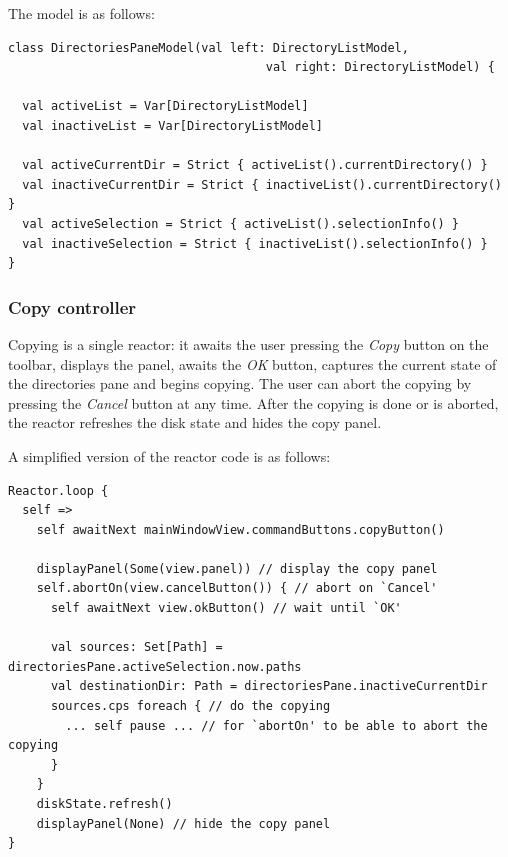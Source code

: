 The model is as follows:


\begin{lstlisting}
class DirectoriesPaneModel(val left: DirectoryListModel,
                                    val right: DirectoryListModel) {

  val activeList = Var[DirectoryListModel]
  val inactiveList = Var[DirectoryListModel]

  val activeCurrentDir = Strict { activeList().currentDirectory() }
  val inactiveCurrentDir = Strict { inactiveList().currentDirectory() }
  val activeSelection = Strict { activeList().selectionInfo() }
  val inactiveSelection = Strict { inactiveList().selectionInfo() }
}
\end{lstlisting}



\subsubsection{Copy controller}

Copying is a single reactor: it awaits the user pressing the \emph{Copy} button on the toolbar, displays the panel, awaits the \emph{OK} button, captures the current state of the directories pane and begins copying. The user can abort the copying by pressing the \emph{Cancel} button at any time. After the copying is done or is aborted, the reactor refreshes the disk state and hides the copy panel.

A simplified version of the reactor code is as follows:

\begin{lstlisting}
Reactor.loop {
  self =>      
    self awaitNext mainWindowView.commandButtons.copyButton()
    
    displayPanel(Some(view.panel)) // display the copy panel
    self.abortOn(view.cancelButton()) { // abort on `Cancel'
      self awaitNext view.okButton() // wait until `OK'

      val sources: Set[Path] = directoriesPane.activeSelection.now.paths
      val destinationDir: Path = directoriesPane.inactiveCurrentDir
      sources.cps foreach { // do the copying
        ... self pause ... // for `abortOn' to be able to abort the copying
      }
    }
    diskState.refresh()
    displayPanel(None) // hide the copy panel
}
\end{lstlisting}


